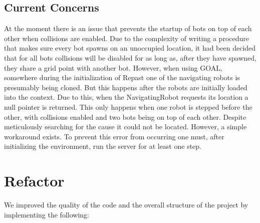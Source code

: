 \subsection*{Current Concerns}
At the moment there is an issue that prevents the startup of bots on top of each other when collisions are enabled. Due to the complexity of writing a procedure that makes sure every bot spawns on an unoccupied location, it had been decided that for all bots collisions will be disabled for as long as, after they have spawned, they share a grid point with another bot. 
However, when using GOAL, somewhere during the initialization of Repast one of the navigating robots is presumably being cloned. But this happens after the robots are initially loaded into the context. Due to this, when the NavigatingRobot requests its location a null pointer is returned. This only happens when one robot is stepped before the other, with collisions enabled and two bots being on top of each other. Despite meticulously searching for the cause it could not be located. However, a simple workaround exists. To prevent this error from occurring one must, after initializing the environment, run the server for at least one step.

\section{Refactor}
We improved the quality of the code and the overall structure of the project by implementing the following:

